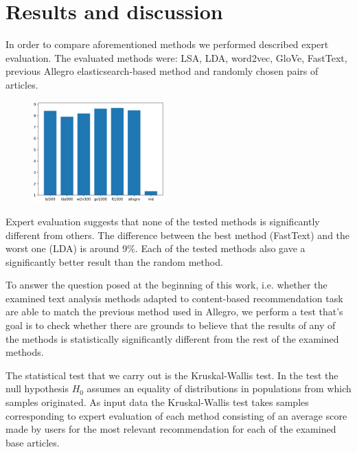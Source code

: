 \documentclass[twoside,twocolumn]{article}
\begin{document}
	
	
	\section{Results and discussion}
	In order to compare aforementioned methods we performed described expert evaluation. The evaluated methods were: LSA, LDA, word2vec, GloVe, FastText, previous Allegro elasticsearch-based method and randomly chosen pairs of articles.


	\begin{figure}
		\centering
		\includegraphics[width=0.45\textwidth]{results.png}
		\caption{}
	\end{figure}
	
	Expert evaluation suggests that none of the tested methods is significantly different from others. The difference between the best method (FastText) and the worst one (LDA) is around 9\%. Each of the tested methods also gave a significantly better result than the random method.
	
	
	To answer the question posed at the beginning of this work, i.e. whether the examined text analysis methods adapted to content-based recommendation task are able to match the previous method used in Allegro, we perform a test that's goal is to check whether there are grounds to believe that the results of any of the methods is statistically significantly different from the rest of the examined methods.
		
		
	The statistical test that we carry out is the Kruskal-Wallis test. In the test the null hypothesis $H_0$ assumes an equality of distributions in populations from which samples originated.	As input data the Kruskal-Wallis test takes samples corresponding to expert evaluation of each method consisting of an average score made by users for the most relevant recommendation for each of the examined base articles.
\end{document}

